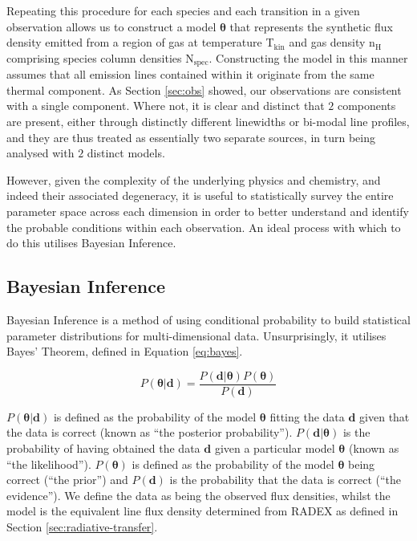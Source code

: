 \documentclass[twocolumn]{aastex631}
\begin{document}
Repeating this procedure for each species and each transition in a given observation allows us to construct a model $\boldsymbol{\theta}$ that represents the synthetic flux density emitted from a region of gas at temperature T$_{\mathrm{kin}}$ and gas density n$_{\mathrm{H}}$ comprising species column densities N$_{\mathrm{spec}}$. Constructing the model in this manner assumes that all emission lines contained within it originate from the same thermal component. As Section \ref{sec:obs} showed, our observations are consistent with a single component. Where not, it is clear and distinct that $2$ components are present, either through distinctly different linewidths or bi-modal line profiles, and they are thus treated as essentially two separate sources, in turn being analysed with $2$ distinct models. 

However, given the complexity of the underlying physics and chemistry, and indeed their associated degeneracy, it is useful to statistically survey the entire parameter space across each dimension in order to better understand and identify the probable conditions within each observation. An ideal process with which to do this utilises Bayesian Inference. 

\subsection{Bayesian Inference}

Bayesian Inference is a method of using conditional probability to build statistical parameter distributions for multi-dimensional data. Unsurprisingly, it utilises Bayes' Theorem, defined in Equation \ref{eq:bayes}.

\begin{equation}
    P(\boldsymbol{\theta} | \boldsymbol{d}) = \frac{P(\boldsymbol{d} | \boldsymbol{\theta}) P(\boldsymbol{\theta})}{P(\boldsymbol{d})} \label{eq:bayes}
\end{equation} 

$P(\boldsymbol{\theta} | \boldsymbol{d})$ is defined as the probability of the model $\boldsymbol{\theta}$ fitting the data $\boldsymbol{d}$ given that the data is correct (known as ``the posterior probability''). $P(\boldsymbol{d} | \boldsymbol{\theta})$ is the probability of having obtained the data $\boldsymbol{d}$ given a particular model $\boldsymbol{\theta}$ (known as ``the likelihood''). $P(\boldsymbol{\theta})$ is defined as the probability of the model $\boldsymbol{\theta}$ being correct (``the prior'') and $P(\boldsymbol{d})$ is the probability that the data is correct (``the evidence''). We define the data as being the observed flux densities, whilst the model is the equivalent line flux density determined from RADEX as defined in Section \ref{sec:radiative-transfer}.
\end{document}
